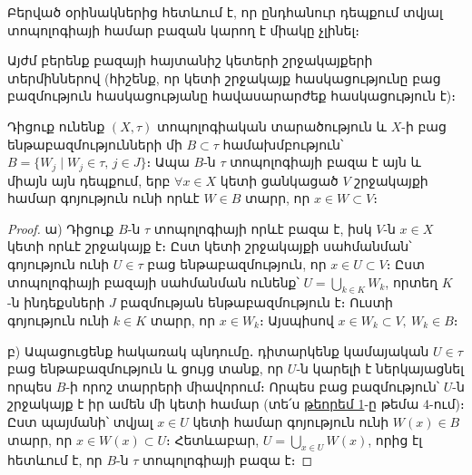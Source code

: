 \documentclass[./main.tex]{subfiles}
\begin{document}
\par Բերված օրինակներից հետևում է, որ ընդհանուր դեպքում տվյալ տոպոլոգիայի համար բազան կարող է միակը չլինել։
\par Այժմ բերենք բազայի հայտանիշ կետերի շրջակայքերի տերմիններով (հիշենք, որ կետի շրջակայք հասկացությունը բաց բազմություն հասկացությանը հա\-վա\-սա\-րար\-ժեք հասկացություն է)։
\begin{theorem}\label{ch5thm1}
Դիցուք ունենք $(X, \tau)$ տոպոլոգիական տարածություն և $X$-ի բաց են\-թա\-բազ\-մու\-թյուն\-նե\-րի մի ${B \subset \tau}$ համախմբություն՝ ${B=\{W_j\mid W_j \in \tau,\, j\in J\}}$։ Ապա $B$-ն $\tau$ տոպո\-լոգիայի բազա է այն և միայն այն դեպքում, երբ $\forall{x} \in X$ կետի ցան\-կա\-ցած $V$ շրջակայքի համար գոյություն ունի որևէ $W \in B$ տարր, որ ${x \in W \subset V}$։ 
\end{theorem}
\begin{proof}
ա) Դիցուք $B$-ն $\tau$ տոպո\-լոգիայի որևէ բազա է, իսկ $V$-ն ${x \in X}$ կետի որևէ շրջակայք է։ Ըստ կետի շրջակայքի սահմանման՝ գոյություն ունի $U \in \tau$ բաց ենթաբազմություն, որ $x \in U \subset V$։ Ըստ տոպո\-լոգիայի բազայի սահմանման ունենք՝ $U=\bigcup\limits_{k \in K} W_k$, որտեղ $K$-ն ինդեքսների $J$ բազմության ենթաբազմություն է։ Ուստի գոյություն ունի $k \in K$ տարր, որ $x \in W_k$։ Այսպիսով $x \in W_k \subset V,\ W_k \in B$։ 
\par բ) Ապացուցենք հակառակ պնդումը․ դիտարկենք կամայական $U \in \tau$ բաց ենթա\-բազ\-մութ\-յուն և ցույց տանք, որ $U$-ն կարելի է ներկայացնել որպես $B$-ի որոշ տար\-րե\-րի միավորում։ Որպես բաց բազմություն՝ $U$-ն շրջակայք է իր ամեն մի կետի համար (տե՛ս \hyperref[ch4thm1]{թեորեմ 1}-ը թեմա 4-ում)։ Ըստ պայմանի՝ տվյալ $x \in U$ կետի համար գոյություն ունի $W(x)\in B$ տարր, որ $x\in W(x)\subset U$։ Հետևաբար, $U=\bigcup\limits_{x\in U}W(x)$, որից էլ հետևում է, որ $B$-ն $\tau$ տոպո\-լոգիայի բազա է։
\end{proof}
\end{document}
